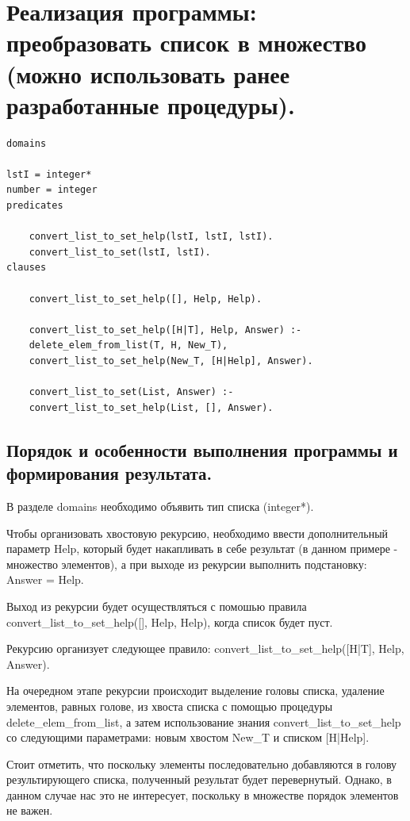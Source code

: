 \documentclass[a4paper,12pt]{article}
\begin{document}
\section*{Реализация программы: преобразовать список в множество (можно использовать ранее разработанные процедуры).}

\begin{verbatim}
domains

lstI = integer*
number = integer
predicates

	convert_list_to_set_help(lstI, lstI, lstI).
	convert_list_to_set(lstI, lstI).
clauses

	convert_list_to_set_help([], Help, Help).
	
	convert_list_to_set_help([H|T], Help, Answer) :-
	delete_elem_from_list(T, H, New_T),
	convert_list_to_set_help(New_T, [H|Help], Answer).
	
	convert_list_to_set(List, Answer) :-
	convert_list_to_set_help(List, [], Answer).
\end{verbatim}

\subsection*{Порядок и особенности выполнения программы и формирования результата.}

В разделе domains необходимо объявить тип списка (integer*).

Чтобы организовать хвостовую рекурсию, необходимо ввести дополнительный параметр Help, который будет накапливать в себе результат (в данном примере - множество элементов), а при выходе из рекурсии выполнить подстановку: Answer = Help.

Выход из рекурсии будет осуществляться с помошью правила convert\_list\_to\_set\_help([], Help, Help), когда список будет пуст.

Рекурсию организует следующее правило: convert\_list\_to\_set\_help([H|T], Help, Answer).

На очередном этапе рекурсии происходит выделение головы списка, удаление элементов, равных голове, из хвоста списка с помощью процедуры delete\_elem\_from\_list, а затем использование знания convert\_list\_to\_set\_help со следующими параметрами: новым хвостом New\_T и списком [H|Help].


Стоит отметить, что поскольку элементы последовательно добавляются в голову результирующего списка, полученный результат будет перевернутый. Однако, в данном случае нас это не интересует, поскольку в множестве порядок элементов не важен.
\end{document}
